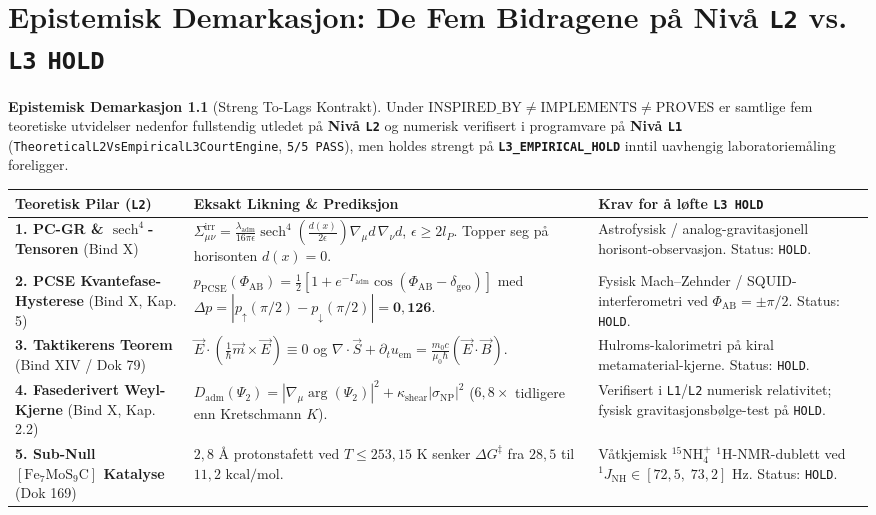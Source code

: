 \documentclass[11pt,a4paper,oneside]{book}
\theoremstyle{definition}
\newtheorem{demarkasjon}{Epistemisk Demarkasjon}[chapter]
\begin{document}
\chapter{Epistemisk Demarkasjon: De Fem Bidragene på Nivå \texttt{L2} vs. \texttt{L3} \texttt{HOLD}}

\begin{demarkasjon}[Streng To-Lags Kontrakt]
Under $\text{INSPIRED\_BY} \neq \text{IMPLEMENTS} \neq \text{PROVES}$ er samtlige fem teoretiske utvidelser nedenfor fullstendig utledet på \textbf{Nivå \texttt{L2}} og numerisk verifisert i programvare på \textbf{Nivå \texttt{L1}} (\texttt{TheoreticalL2VsEmpiricalL3CourtEngine}, \texttt{5/5 PASS}), men holdes strengt på \textbf{\texttt{L3\_EMPIRICAL\_HOLD}} inntil uavhengig laboratoriemåling foreligger.
\end{demarkasjon}

\begin{center}
\renewcommand{\arraystretch}{1.45}
\begin{longtable}{p{3.4cm}p{6.6cm}p{4.5cm}}
\toprule
\textbf{Teoretisk Pilar (\texttt{L2})} & \textbf{Eksakt Likning \& Prediksjon} & \textbf{Krav for å løfte \texttt{L3 HOLD}} \\
\midrule
\endhead
\textbf{1. PC-GR \& $\operatorname{sech}^4$-Tensoren} (Bind X) &
$\Sigma_{\mu\nu}^{\text{irr}} = \frac{\lambda_{\text{adm}}}{16\pi\epsilon}\operatorname{sech}^4\!\left(\frac{d(x)}{2\epsilon}\right)\nabla_\mu d\,\nabla_\nu d$, $\epsilon \ge 2l_P$. Topper seg på horisonten $d(x)=0$. &
Astrofysisk / analog-gravitasjonell horisont-observasjon. Status: \texttt{HOLD}. \\
\textbf{2. PCSE Kvantefase-Hysterese} (Bind X, Kap. 5) &
$p_{\text{PCSE}}(\Phi_{\text{AB}}) = \frac{1}{2}[1 + e^{-\Gamma_{\text{adm}}}\cos(\Phi_{\text{AB}} - \delta_{\text{geo}})]$ med $\Delta p = |p_\uparrow(\pi/2) - p_\downarrow(\pi/2)| = \mathbf{0,126}$. &
Fysisk Mach--Zehnder / SQUID-interferometri ved $\Phi_{\text{AB}} = \pm\pi/2$. Status: \texttt{HOLD}. \\
\textbf{3. Taktikerens Teorem} (Bind XIV / Dok 79) &
$\vec{E}\cdot(\frac{1}{\hbar}\vec{m}\times\vec{E}) \equiv 0$ og $\nabla\cdot\vec{S} + \partial_t u_{\text{em}} = \frac{m_0 c}{\mu_0\hbar}(\vec{E}\cdot\vec{B})$. &
Hulroms-kalorimetri på kiral metamaterial-kjerne. Status: \texttt{HOLD}. \\
\textbf{4. Fasederivert Weyl-Kjerne} (Bind X, Kap. 2.2) &
$D_{\text{adm}}(\Psi_2) = |\nabla_\mu\arg(\Psi_2)|^2 + \kappa_{\text{shear}}|\sigma_{\text{NP}}|^2$ ($6,8\times$ tidligere enn Kretschmann $K$). &
Verifisert i \texttt{L1}/\texttt{L2} numerisk relativitet; fysisk gravitasjonsbølge-test på \texttt{HOLD}. \\
\textbf{5. Sub-Null $[\text{Fe}_7\text{MoS}_9\text{C}]$ Katalyse} (Dok 169) &
$2,8\text{ \AA}$ protonstafett ved $T \le 253,15\text{ K}$ senker $\Delta G^\ddagger$ fra $28,5$ til $11,2\text{ kcal/mol}$. &
Våtkjemisk $^{15}\text{NH}_4^+$ $^1\text{H}$-NMR-dublett ved ${}^1J_{\text{NH}} \in [72,5,\;73,2]\text{ Hz}$. Status: \texttt{HOLD}. \\
\bottomrule
\end{longtable}
\end{center}
\end{document}
